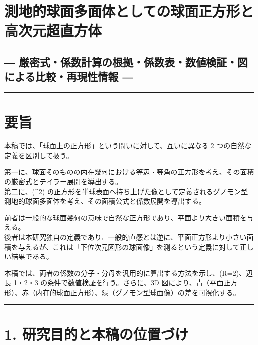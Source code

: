 \documentclass[
  12pt,
  a4paper,
]{article}
\author{}
\date{}
\begin{document}
\section{測地的球面多面体としての球面正方形と高次元超直方体}\label{ux6e2cux5730ux7684ux7403ux9762ux591aux9762ux4f53ux3068ux3057ux3066ux306eux7403ux9762ux6b63ux65b9ux5f62ux3068ux9ad8ux6b21ux5143ux8d85ux76f4ux65b9ux4f53}

\subsection{―
厳密式・係数計算の根拠・係数表・数値検証・図による比較・再現性情報
―}\label{ux53b3ux5bc6ux5f0fux4fc2ux6570ux8a08ux7b97ux306eux6839ux62e0ux4fc2ux6570ux8868ux6570ux5024ux691cux8a3cux56f3ux306bux3088ux308bux6bd4ux8f03ux518dux73feux6027ux60c5ux5831}

\begin{center}\rule{0.5\linewidth}{0.5pt}\end{center}

\section{要旨}\label{ux8981ux65e8}

本稿では、「球面上の正方形」という問いに対して、互いに異なる 2
つの自然な定義を区別して扱う。

第一に、球面そのものの内在幾何における等辺・等角の正方形を考え、その面積の厳密式とテイラー展開を導出する。\\
第二に、(\^{}2)
の正方形を半球表面へ持ち上げた像として定義されるグノモン型測地的球面多面体を考え、その面積公式と係数展開を導出する。

前者は一般的な球面幾何の意味で自然な正方形であり、平面より大きい面積を与える。\\
後者は本研究独自の定義であり、一般的直感とは逆に、平面正方形より小さい面積を与えるが、これは「下位次元図形の球面像」を測るという定義に対して正しい結果である。

本稿では、両者の係数の分子・分母を汎用的に算出する方法を示し、(R=2)、辺長
1・2・3 の条件で数値検証を行う。さらに、3D
図により、青（平面正方形）、赤（内在的球面正方形）、緑（グノモン型球面像）の差を可視化する。

\begin{center}\rule{0.5\linewidth}{0.5pt}\end{center}

\section{1.
研究目的と本稿の位置づけ}\label{ux7814ux7a76ux76eeux7684ux3068ux672cux7a3fux306eux4f4dux7f6eux3065ux3051}
\end{document}
